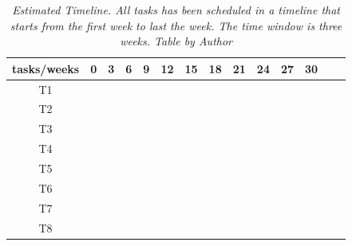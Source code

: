 \begin{table}[H]
\centering
\label{tab:340W}
\begin{tabular}{| c | c | c | c |c | c | c |c | c | c |c | c | c |c | }
\hline
tasks/weeks & 0 & 3 & 6 & 9 & 12 & 15 & 18 & 21 & 24 & 27 & 30 \\
\hline
T1  & \cellcolor{red!50} &   &   &   &   &   &   &   &   &   &     \\
\hline
T2  &   & \cellcolor{lime!50}  &  &  &   &   &   &    &  &  &   \\
\hline
T3  &  &  & \cellcolor{blue!40} &  &   &   &   &   &  &  & \\
\hline
T4  &  &  &  & \cellcolor{teal!50} & \cellcolor{teal!50} &  &  &   &   &   &   \\
\hline
T5  &  &  &  &  & \cellcolor{amber!30} & \cellcolor{amber!30} & \cellcolor{amber!30}  & \cellcolor{amber!30} & \cellcolor{amber!30}  &  & \\
\hline
T6  &  &  &  &  & \cellcolor{black!70} & \cellcolor{black!70} & \cellcolor{black!70}  & \cellcolor{black!70} & \cellcolor{black!70}  &  \cellcolor{black!70} & \\
\hline
T7  &   &  &  &  &  &  &  &   &    & \cellcolor{gray!50} & \\
\hline
T8  &   &  &  &  &  & \cellcolor{orange!50}  &  &   &   & \cellcolor{orange!50} & \cellcolor{orange!50} \\
\hline
\end{tabular}
\caption[Estimated Timeline.]
  {\textit{Estimated Timeline.
  All tasks has been scheduled in a timeline that starts from the first week to last the week.
  The time window is three weeks.
  Table by Author}}
\end{table}
